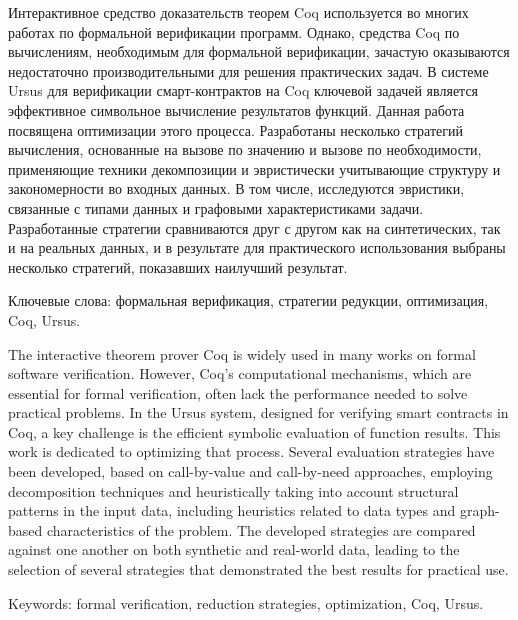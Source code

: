 \documentclass[../diploma.tex]{subfiles}
\begin{document}
Интерактивное средство доказательств теорем Coq используется во многих работах по формальной верификации программ. Однако, средства Coq по вычислениям, необходимым для формальной верификации, зачастую оказываются недостаточно производительными для решения практических задач. В системе Ursus для верификации смарт-контрактов на Coq ключевой задачей является эффективное символьное вычисление результатов функций. Данная работа посвящена оптимизации этого процесса. Разработаны несколько стратегий вычисления, основанные на вызове по значению и вызове по необходимости, применяющие техники декомпозиции и эвристически учитывающие структуру и закономерности во входных данных. В том числе, исследуются эвристики, связанные с типами данных и графовыми характеристиками задачи. Разработанные стратегии сравниваются друг с другом как на синтетических, так и на реальных данных, и в результате для практического использования выбраны несколько стратегий, показавших наилучший результат.

\vspace*{\fill}

Ключевые слова: формальная верификация, стратегии редукции, оптимизация, Coq, Ursus.

\newpage

The interactive theorem prover Coq is widely used in many works on formal software verification. However, Coq's computational mechanisms, which are essential for formal verification, often lack the performance needed to solve practical problems. In the Ursus system, designed for verifying smart contracts in Coq, a key challenge is the efficient symbolic evaluation of function results. This work is dedicated to optimizing that process. Several evaluation strategies have been developed, based on call-by-value and call-by-need approaches, employing decomposition techniques and heuristically taking into account structural patterns in the input data, including heuristics related to data types and graph-based characteristics of the problem. The developed strategies are compared against one another on both synthetic and real-world data, leading to the selection of several strategies that demonstrated the best results for practical use.

\vspace*{\fill}

Keywords: formal verification, reduction strategies, optimization, Coq, Ursus.
\end{document}
